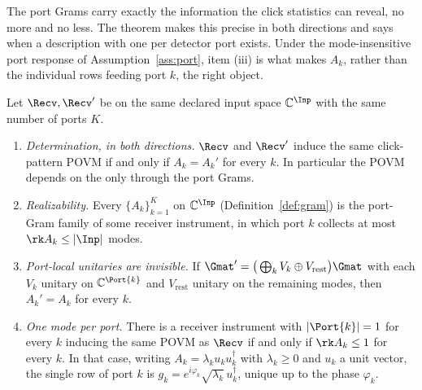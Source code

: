 
The port Grams carry exactly the information the click statistics can
reveal, no more and no less. The theorem makes this precise in both
directions and says when a description with one  per
detector port exists. Under the mode-insensitive port response of
Assumption~\ref{ass:port}, item (iii) is what makes $A_k$, rather than the
individual rows feeding port $k$, the right object.

\begin{theorem}\label{thm:representation-independence}
Let $\Recv,\Recv'$ be  on the same declared input space
$\mathbb{C}^{\Inp}$ with the same number of ports $K$.
\begin{enumerate}[label=(\roman*),leftmargin=3.0em]
\item \emph{Determination, in both directions.} $\Recv$ and $\Recv'$ induce the
  same click-pattern POVM if and only if $A_k=A_k'$ for every $k$. In
  particular the POVM depends on the  only through the
  port Grams.
\item \emph{Realizability.} Every  $\{A_k\}_{k=1}^{K}$ on
  $\mathbb{C}^{\Inp}$ (Definition~\ref{def:gram}) is the port-Gram family of
  some receiver instrument, in which port $k$ collects at most
  $\rk A_k\le|\Inp|$ modes.
\item \emph{Port-local unitaries are invisible.} If
  $\Gmat'=\big(\bigoplus_kV_k\oplus V_{\mathrm{rest}}\big)\Gmat$ with each
  $V_k$ unitary on $\mathbb{C}^{\Port{k}}$ and $V_{\mathrm{rest}}$ unitary on
  the remaining modes, then $A_k'=A_k$ for every $k$.
\item \emph{One mode per port.} There is a receiver instrument with
  $|\Port{k}|=1$ for every $k$ inducing the same POVM as $\Recv$ if and only if
  $\rk A_k\le1$ for every $k$. In that case, writing
  $A_k=\lambda_ku_ku_k^\dagger$ with $\lambda_k\ge0$ and $u_k$ a unit vector,
  the single row of port $k$ is $g_k=e^{i\varphi_k}\sqrt{\lambda_k}\,
  u_k^\dagger$, unique up to the phase $\varphi_k$.
\end{enumerate}
\end{theorem}


